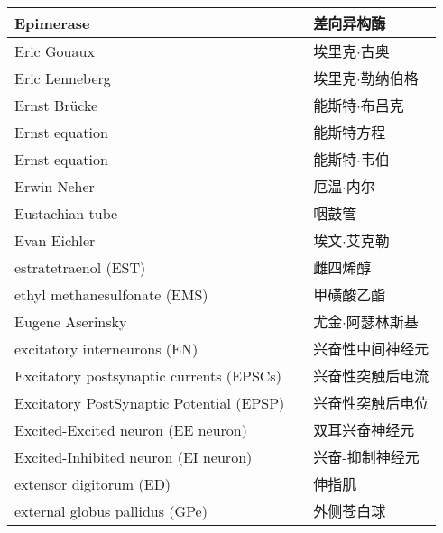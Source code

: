 \begin{longtable}{lll}
	\midrule
	Epimerase    &&  差向异构酶  \\
	
	\midrule
	Eric Gouaux    &&  埃里克$\cdot$古奥  \\
	
	\midrule
	Eric Lenneberg    &&  埃里克$\cdot$勒纳伯格  \\
	
	\midrule
	Ernst Brücke    &&  能斯特$\cdot$布吕克  \\
	
	\midrule
	Ernst equation    &&  能斯特方程  \\
	
	\midrule
	Ernst equation    &&  能斯特$\cdot$韦伯  \\
	
	\midrule
	Erwin Neher    &&  厄温$\cdot$内尔  \\
	
	\midrule
	Eustachian tube    &&  咽鼓管  \\
	
	\midrule
	Evan Eichler    &&  埃文$\cdot$艾克勒  \\
	
	\midrule
	estratetraenol (EST)   &&  雌四烯醇  \\
	
	\midrule
	ethyl methanesulfonate (EMS)    &&  甲磺酸乙酯  \\
	
	\midrule
	Eugene Aserinsky    &&  尤金$\cdot$阿瑟林斯基  \\
	
	\midrule
	excitatory interneurons  (EN)  &&  兴奋性中间神经元  \\
	
	\midrule
	Excitatory postsynaptic currents (EPSCs)     &&  兴奋性突触后电流  \\
	
	\midrule
	Excitatory PostSynaptic Potential (EPSP)     &&  兴奋性突触后电位  \\
	
	\midrule
	Excited-Excited neuron (EE neuron)     &&  双耳兴奋神经元  \\
	
	\midrule
	Excited-Inhibited neuron (EI neuron)     && 兴奋-抑制神经元   \\
	
	\midrule
	extensor digitorum (ED)     && 伸指肌   \\
	
	\midrule
	external globus pallidus (GPe)     && 外侧苍白球   \\
	

\end{longtable}
